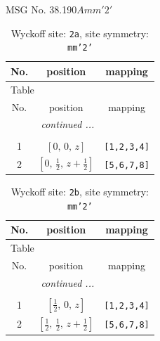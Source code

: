 \documentclass[fleqn,8pt]{jsarticle}
\begin{document}
\setcounter{MaxMatrixCols}{32}

\renewcommand{\tablename}{Table~}
\renewcommand{\figurename}{Figure~}
\begin{center}
\LARGE
MSG No. 38.190\quad$Amm'2'$
\end{center}
\renewcommand{\arraystretch}{1.2}
\begin{longtable}{ccc}
\caption{Wyckoff site: {\tt 2a}, site symmetry: {\tt mm'2'}}
 \\
 \hline \hline
No. & position & mapping \\ \hline \endfirsthead

\multicolumn{2}{l}{\tablename\ \thetable{}} \\
 \hline \hline
No. & position & mapping \\ \hline \endhead

 \hline \hline
\multicolumn{2}{r}{\footnotesize\it continued ...} \\ \endfoot

 \hline \hline
\multicolumn{2}{r}{} \\ \endlastfoot

1 & $\left[ 0,\, 0,\, z \right]$ & {\tt [1,2,3,4]} \\ \hline
2 & $\left[ 0,\, \frac{1}{2},\, z + \frac{1}{2} \right]$ & {\tt [5,6,7,8]} \\
\end{longtable}
\renewcommand{\arraystretch}{1.2}
\begin{longtable}{ccc}
\caption{Wyckoff site: {\tt 2b}, site symmetry: {\tt mm'2'}}
 \\
 \hline \hline
No. & position & mapping \\ \hline \endfirsthead

\multicolumn{2}{l}{\tablename\ \thetable{}} \\
 \hline \hline
No. & position & mapping \\ \hline \endhead

 \hline \hline
\multicolumn{2}{r}{\footnotesize\it continued ...} \\ \endfoot

 \hline \hline
\multicolumn{2}{r}{} \\ \endlastfoot

1 & $\left[ \frac{1}{2},\, 0,\, z \right]$ & {\tt [1,2,3,4]} \\ \hline
2 & $\left[ \frac{1}{2},\, \frac{1}{2},\, z + \frac{1}{2} \right]$ & {\tt [5,6,7,8]} \\
\end{longtable}
\end{document}
